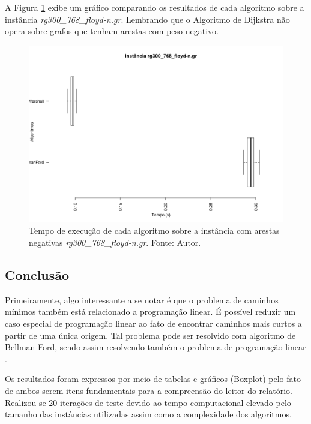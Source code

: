 \documentclass[12pt]{article}
\begin{document}
A Figura \ref{fig:rg300_768_floyd_n} exibe um gráfico comparando os resultados de cada algoritmo sobre a instância \textit{ rg300\_768\_floyd-n.gr}. Lembrando que o Algoritmo de Dijkstra não opera sobre grafos que tenham arestas com peso negativo.

\begin{figure}[H]
  \centering
    \includegraphics[width=1\textwidth]{img/rg300_768_floyd-n_gr.png}
  \caption{Tempo de execução de cada algoritmo sobre a instância com arestas negativas \textit{rg300\_768\_floyd-n.gr}. Fonte: Autor.}
  \label{fig:rg300_768_floyd_n}
\end{figure}


\subsection{Conclusão}\label{sec:figs}


Primeiramente, algo interessante a se notar é que o problema de caminhos mínimos também está relacionado a programação linear. É possível reduzir um caso especial de programação linear ao fato de encontrar caminhos mais curtos a partir de uma única origem. Tal problema pode ser resolvido com algoritmo de Bellman-Ford, sendo assim resolvendo também o problema de programação linear \cite{cormen2002algoritmos}.

Os resultados foram expressos por meio de tabelas e gráficos (Boxplot) pelo fato de ambos serem itens fundamentais para a compreensão do leitor do relatório. Realizou-se 20 iterações de teste devido ao tempo computacional elevado pelo tamanho das instâncias utilizadas assim como a complexidade dos algoritmos. 
\end{document}
